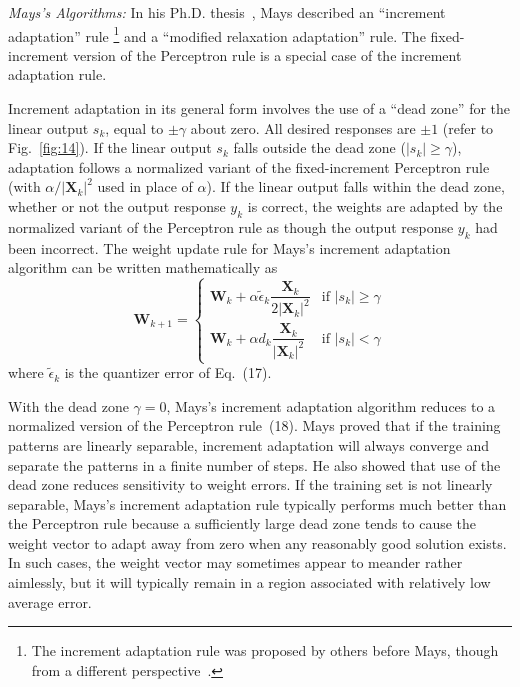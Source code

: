 \documentclass[10pt,twocolumn]{article}
\newcommand{\X}{\bm{X}}
\newcommand{\W}{\bm{W}}
\begin{document}
\textit{Mays's Algorithms:} In his Ph.D. thesis~\cite{mays}, Mays described an
``increment adaptation'' rule%
\footnote{The increment adaptation rule was proposed by others before Mays, though
from a different perspective~\cite{block}.}
and a ``modified relaxation adaptation'' rule. The fixed-increment version of the
Perceptron rule is a special case of the increment adaptation rule.

Increment adaptation in its general form involves the use of a ``dead zone'' for
the linear output $s_k$, equal to $\pm\gamma$ about zero. All desired responses are
$\pm 1$ (refer to Fig.~\ref{fig:14}). If the linear output $s_k$ falls outside the
dead zone ($|s_k| \ge \gamma$), adaptation follows a normalized variant of the
fixed-increment Perceptron rule (with $\alpha/|\X_k|^2$ used in place of $\alpha$).
If the linear output falls within the dead zone, whether or not the output
response $y_k$ is correct, the weights are adapted by the normalized variant of the
Perceptron rule as though the output response $y_k$ had been incorrect. The weight
update rule for Mays's increment adaptation algorithm can be written mathematically
as
\begin{equation}
\W_{k+1}=
\begin{cases}
\W_k + \alpha\tilde{\epsilon}_k\dfrac{\X_k}{2|\X_k|^2} & \text{if } |s_k| \ge \gamma\\[1.4ex]
\W_k + \alpha d_k\dfrac{\X_k}{|\X_k|^2} & \text{if } |s_k| < \gamma
\end{cases}\tag{19}
\end{equation}
where $\tilde{\epsilon}_k$ is the quantizer error of Eq.~(17).

With the dead zone $\gamma = 0$, Mays's increment adaptation algorithm reduces to
a normalized version of the Perceptron rule~(18). Mays proved that if the training
patterns are linearly separable, increment adaptation will always converge and
separate the patterns in a finite number of steps. He also showed that use of the
dead zone reduces sensitivity to weight errors. If the training set is not linearly
separable, Mays's increment adaptation rule typically performs much better than the
Perceptron rule because a sufficiently large dead zone tends to cause the weight
vector to adapt away from zero when any reasonably good solution exists. In such
cases, the weight vector may sometimes appear to meander rather aimlessly, but it
will typically remain in a region associated with relatively low average error.
\end{document}
